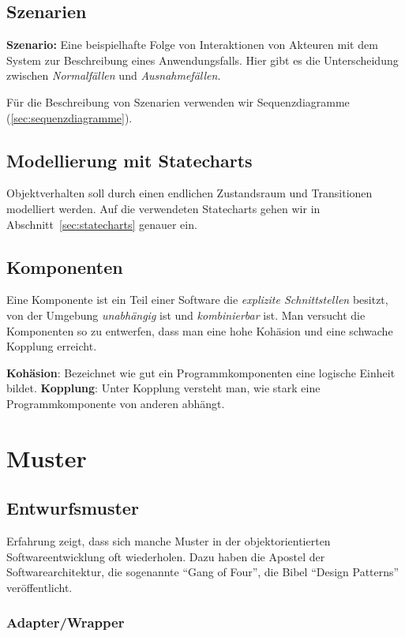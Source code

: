 \documentclass{panikzettel}
\begin{document}
\subsection{Szenarien}

\textbf{Szenario:} Eine beispielhafte Folge von Interaktionen von Akteuren mit dem System zur Beschreibung eines Anwendungsfalls.
Hier gibt es die Unterscheidung zwischen \emph{Normalfällen} und \emph{Ausnahmefällen}.

Für die Beschreibung von Szenarien verwenden wir Sequenzdiagramme (\ref{sec:sequenzdiagramme}).

\subsection{Modellierung mit Statecharts}

Objektverhalten soll durch einen endlichen Zustandsraum und Transitionen modelliert werden. Auf die verwendeten Statecharts gehen wir in Abschnitt~\ref{sec:statecharts} genauer ein.

\subsection{Komponenten}

Eine Komponente ist ein Teil einer Software die \emph{explizite Schnittstellen} besitzt, von der Umgebung \emph{unabhängig} ist und \emph{kombinierbar} ist. Man versucht die Komponenten so zu entwerfen, dass man eine hohe Kohäsion und eine schwache Kopplung erreicht.

\textbf{Kohäsion}: Bezeichnet wie gut ein Programmkomponenten eine logische Einheit bildet.
\textbf{Kopplung}: Unter Kopplung versteht man, wie stark eine Programmkomponente von anderen abhängt.

\section{Muster}
\label{sec:muster}

\subsection{Entwurfsmuster}

Erfahrung zeigt, dass sich manche Muster in der objektorientierten Softwareentwicklung oft wiederholen. Dazu haben die Apostel der Softwarearchitektur, die sogenannte ``Gang of Four'', die Bibel ``Design Patterns'' veröffentlicht.

\subsubsection{Adapter/Wrapper}
\end{document}

